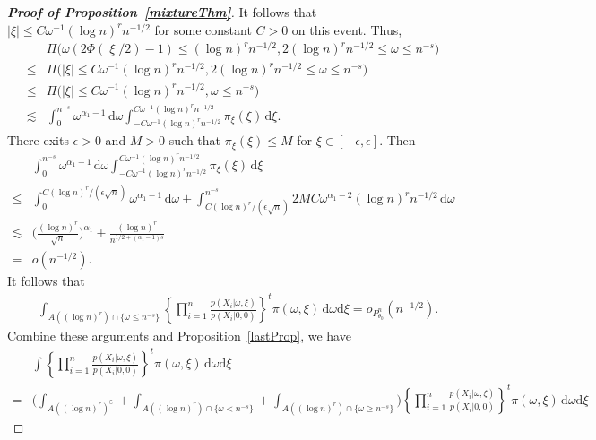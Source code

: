 \documentclass[11pt]{article}
\theoremstyle{plain}
\theoremstyle{definition}
\theoremstyle{remark}
\begin{document}
\begin{appendices}
\begin{proof}[\textbf{Proof of Proposition~\ref{mixtureThm}}]
It follows that
$
|\xi|\leq C\omega^{-1} (\log n)^r n^{-1/2}
$
for some constant $C>0$ on this event.
Thus,
\begin{align*}
    &\Pi\big(\omega(2\Phi(|\xi|/2)-1)\leq (\log n)^r n^{-1/2},   2(\log n)^r n^{-1/2} \leq \omega\leq n^{-s}\big)
    \\
    \leq
    &\Pi\big(|\xi|\leq C \omega^{-1} (\log n)^r n^{-1/2},   2(\log n)^r n^{-1/2} \leq \omega\leq n^{-s}\big)
    \\
    \leq
    &\Pi\big(|\xi|\leq C \omega^{-1} (\log n)^r n^{-1/2},\omega\leq n^{-s}\big)
    \\
    \lesssim &
    \int_{0}^{n^{-s}} \omega^{\alpha_1-1}\, \mathrm d\omega
    \int_{-C \omega^{-1} (\log n)^r n^{-1/2}}^{C \omega^{-1} (\log n)^r n^{-1/2}} \pi_{\xi}(\xi) \, \mathrm d\xi.
\end{align*}
There exits $\epsilon>0$ and $M>0$ such that $\pi_{\xi}(\xi)\leq M$ for $\xi\in [-\epsilon,\epsilon]$. Then
\begin{align*}
    &\int_{0}^{n^{-s}} \omega^{\alpha_1-1}\, \mathrm d\omega
    \int_{-C \omega^{-1} (\log n)^r n^{-1/2}}^{C \omega^{-1} (\log n)^r n^{-1/2}} \pi_{\xi}(\xi) \, \mathrm d\xi
    \\
    \leq &
    \int_{0}^{{C(\log n)^r}/{(\epsilon \sqrt{n})}} \omega^{\alpha_1-1}\, \mathrm d\omega
    +
    \int_{{C(\log n)^r}/{(\epsilon \sqrt{n})}}^{n^{-s}} 
    2MC \omega^{\alpha_1-2}(\log n)^r n^{-1/2}
    \, \mathrm d\omega
    \\
    \lesssim &
     \Big(\frac{(\log n)^r}{\sqrt{n}}\Big)^{\alpha_1}
     +\frac{(\log n)^r}{n^{1/2 + (\alpha_1 - 1) s }}
     \\
     = & 
    o(n^{-1/2})
     .
\end{align*}
It follows that
\begin{align*}
    & \int_{A( (\log n)^r )\cap \{\omega\leq n^{-s}\}} \left\{\prod_{i=1}^n \frac{p(X_i|\omega,\xi)}{p(X_i|0,0)}\right\}^t \pi(\omega,\xi)\, \mathrm d\omega \mathrm d\xi
    =
    o_{P^n_{\theta_0}}(n^{-1/2})
    .
\end{align*}
Combine these arguments and Proposition~\ref{lastProp}, we have
\begin{align*}
    & \int \left\{ \prod_{i=1}^n \frac{p(X_i|\omega,\xi)}{p(X_i|0,0)}\right\}^t \pi(\omega,\xi)\, \mathrm d\omega \mathrm d\xi
    \\
=& \bigg( \int_{A( (\log n)^r )^\complement}+\int_{A( (\log n)^r )\cap \{\omega< n^{-s}\}}+\int_{A( (\log n)^r )\cap \{\omega\geq n^{-s}\}}\bigg) \left\{ \prod_{i=1}^n \frac{p(X_i|\omega,\xi)}{p(X_i|0,0)}\right\}^t \pi(\omega,\xi)\, \mathrm d\omega \mathrm d\xi

\end{align*}
\end{proof}
\end{appendices}
\end{document}
